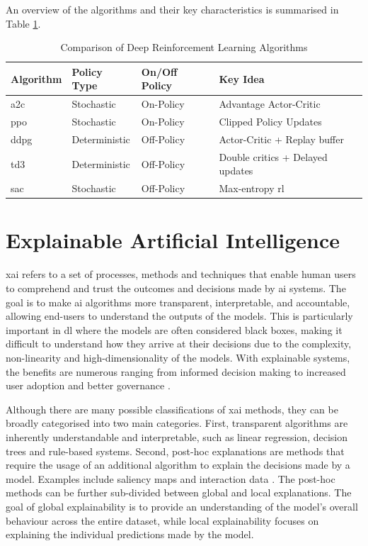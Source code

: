 An overview of the algorithms and their key characteristics is summarised in Table \ref{tab:drl_algorithms_comparison}. 

\begin{table}[h]
    \centering
    \begin{tabular}{|l|l|l|l|}
        \hline
        Algorithm & Policy Type & On/Off Policy & Key Idea \\
        \hline
        \acrshort{a2c} & Stochastic & On-Policy & Advantage Actor-Critic \\
        \acrshort{ppo} & Stochastic & On-Policy & Clipped Policy Updates \\
        \acrshort{ddpg} & Deterministic & Off-Policy & Actor-Critic + Replay buffer \\
        \acrshort{td3} & Deterministic & Off-Policy & Double critics + Delayed updates \\
        \acrshort{sac} & Stochastic & Off-Policy & Max-entropy \acrshort{rl} \\
        \hline
    \end{tabular}
    \caption{Comparison of Deep Reinforcement Learning Algorithms}
    \label{tab:drl_algorithms_comparison}
\end{table}

\section{Explainable Artificial Intelligence} \label{sec:explainableai}

\acrfull{xai} refers to a set of processes, methods and techniques that enable human users to comprehend and trust the outcomes and decisions made by \acrfull{ai} systems. The goal is to make \acrshort{ai} algorithms more transparent, interpretable, and accountable, allowing end-users to understand the outputs of the models. This is particularly important in \acrfull{dl} where the models are often considered black boxes, making it difficult to understand how they arrive at their decisions due to the complexity, non-linearity and high-dimensionality of the models. With explainable systems, the benefits are numerous ranging from informed decision making to increased user adoption and better governance \cite{Phillips2021}. 

Although there are many possible classifications of \acrshort{xai} methods, they can be broadly categorised into two main categories. First, transparent algorithms are inherently understandable and interpretable, such as linear regression, decision trees and rule-based systems. Second, post-hoc explanations are methods that require the usage of an additional algorithm to explain the decisions made by a model. Examples include saliency maps \cite{Sequeira2020} and interaction data \cite{Greydanus2018}. The post-hoc methods can be further sub-divided between global and local explanations. The goal of global explainability is to provide an understanding of the model's overall behaviour across the entire dataset, while local explainability focuses on explaining the individual predictions made by the model.

